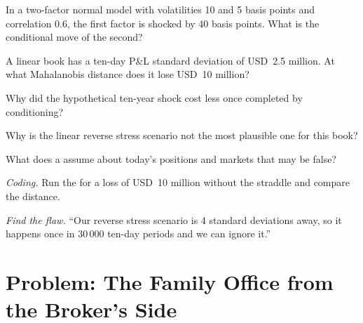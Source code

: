 \begin{exercise}[$\star$]\label{exo:rc:stress-testing-and-scenarios:2}
In a two-factor normal model with volatilities 10 and 5 basis points and correlation 0.6, the
first factor is shocked by 40 basis points. What is the conditional move of the second?
\end{exercise}

\begin{exercise}[$\star$]\label{exo:rc:stress-testing-and-scenarios:3}
A linear book has a ten-day P\&L standard deviation of USD~2.5 million. At what Mahalanobis
distance does it lose USD~10 million?
\end{exercise}

\begin{exercise}[$\star\star$]\label{exo:rc:stress-testing-and-scenarios:4}
Why did the hypothetical ten-year shock cost less once completed by conditioning?
\end{exercise}

\begin{exercise}[$\star\star$]\label{exo:rc:stress-testing-and-scenarios:5}
Why is the linear reverse stress scenario not the most plausible one for this book?
\end{exercise}

\begin{exercise}[$\star\star$]\label{exo:rc:stress-testing-and-scenarios:6}
What does a  assume about today's positions and markets that may be false?
\end{exercise}

\begin{exercise}[$\star\star\star$]\label{exo:rc:stress-testing-and-scenarios:7}
\emph{Coding.} Run the  for a loss of USD~10 million without the straddle and
compare the distance.
\end{exercise}

\begin{exercise}[$\star\star\star$]\label{exo:rc:stress-testing-and-scenarios:8}
\emph{Find the flaw.} ``Our reverse stress scenario is 4 standard deviations away, so it happens
once in 30\,000 ten-day periods and we can ignore it.''
\end{exercise}

\section{Problem: The Family Office from the Broker's Side}

